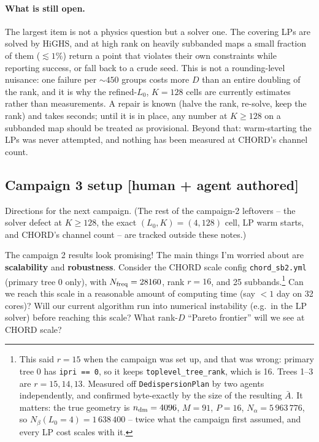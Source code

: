 \documentclass{article}
\numberwithin{equation}{section}   %
\begin{document}
\paragraph{What is still open.}
The largest item is not a physics question but a solver one. The covering LPs are solved by HiGHS,
and at high rank on heavily subbanded maps a small fraction of them ($\lesssim 1\%$) return a
point that violates their own constraints while reporting success, or fall back to a crude seed.
This is not a rounding-level nuisance: one failure per $\sim450$ groups costs more $D$ than an
entire doubling of the rank, and it is why the refined-$L_0$, $K = 128$ cells are currently
estimates rather than measurements. A repair is known (halve the rank, re-solve, keep the rank)
and takes seconds; until it is in place, any number at $K \ge 128$ on a subbanded map should be
treated as provisional. Beyond that: warm-starting the LPs was never attempted, and nothing has
been measured at CHORD's channel count.

\subsection{Campaign 3 setup [human + agent authored]}
\label{ssec:campaign3_setup}

Directions for the next campaign. (The rest of the campaign-2 leftovers -- the solver defect at
$K \ge 128$, the exact $(L_0, K) = (4, 128)$ cell, LP warm starts, and CHORD's channel count --
are tracked outside these notes.)

The campaign 2 results look promising!
The main things I'm worried about are {\bf scalability} and {\bf robustness}.
Consider the CHORD scale config \verb|chord_sb2.yml| (primary tree 0 only), with
$N_{\rm freq} = 28160$, rank $r=16$, and 25 subbands.\footnote{This said $r=15$ when the campaign
was set up, and that was wrong: primary tree 0 has {\tt ipri == 0}, so it keeps
{\tt toplevel\_tree\_rank}, which is 16. Trees 1--3 are $r=15,14,13$. Measured off
{\tt DedispersionPlan} by two agents independently, and confirmed byte-exactly by the size of the
resulting $\bar A$. It matters: the true geometry is $n_{\rm dm} = 4096$, $M = 91$, $P = 16$,
$N_\alpha = 5\,963\,776$, so $N_\beta(L_0{=}4) = 1\,638\,400$ -- twice what the campaign first
assumed, and every LP cost scales with it.}
Can we reach this scale in a reasonable amount of computing time (say $<1$ day on 32 cores)?
Will our current algorithm run into numerical instability (e.g.\ in the LP solver) before
reaching this scale?
What rank-$D$ ``Pareto frontier'' will we see at CHORD scale?
\end{document}
